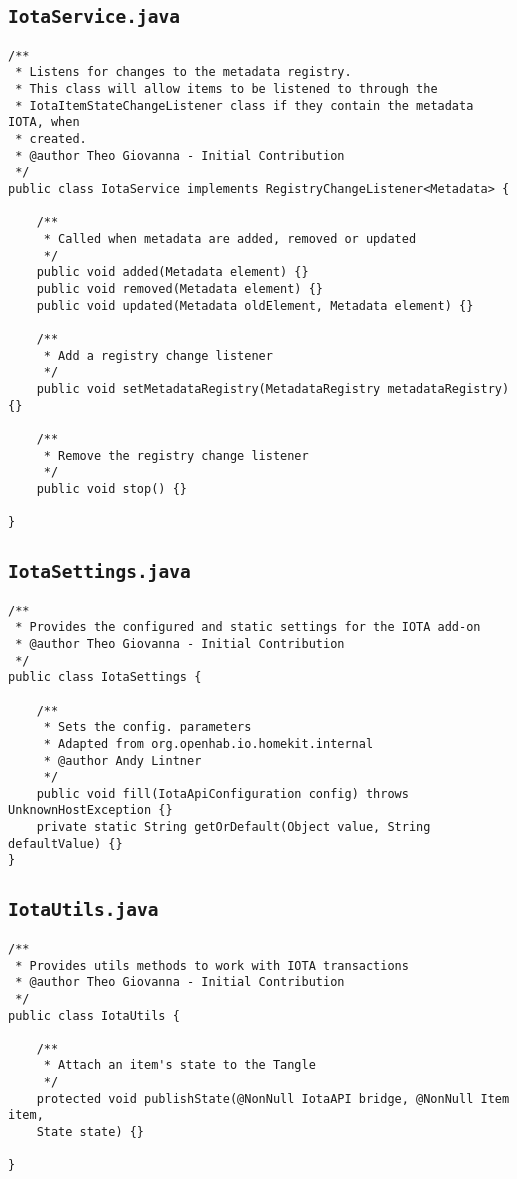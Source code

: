 \documentclass[a4paper,10pt]{article}
\begin{document}
\subsection{\texttt{IotaService.java}}

\begin{verbatim}
/**
 * Listens for changes to the metadata registry.
 * This class will allow items to be listened to through the
 * IotaItemStateChangeListener class if they contain the metadata IOTA, when
 * created.
 * @author Theo Giovanna - Initial Contribution
 */
public class IotaService implements RegistryChangeListener<Metadata> {
	
	/**
	 * Called when metadata are added, removed or updated
	 */ 
	public void added(Metadata element) {}
	public void removed(Metadata element) {}
	public void updated(Metadata oldElement, Metadata element) {}
	
	/**
	 * Add a registry change listener
	 */
	public void setMetadataRegistry(MetadataRegistry metadataRegistry) {}
	
	/**
	 * Remove the registry change listener
	 */
	public void stop() {}
	
}

\end{verbatim}

\newpage 

\subsection{\texttt{IotaSettings.java}}

\begin{verbatim}
/**
 * Provides the configured and static settings for the IOTA add-on
 * @author Theo Giovanna - Initial Contribution
 */
public class IotaSettings {

	/**
	 * Sets the config. parameters
	 * Adapted from org.openhab.io.homekit.internal
	 * @author Andy Lintner
	 */
	public void fill(IotaApiConfiguration config) throws UnknownHostException {}
	private static String getOrDefault(Object value, String defaultValue) {}
}

\end{verbatim}

\subsection{\texttt{IotaUtils.java}}

\begin{verbatim}
/**
 * Provides utils methods to work with IOTA transactions
 * @author Theo Giovanna - Initial Contribution
 */
public class IotaUtils {
	
	/**
	 * Attach an item's state to the Tangle
	 */
	protected void publishState(@NonNull IotaAPI bridge, @NonNull Item item, 
	State state) {}
	
}
\end{verbatim}
\end{document}
